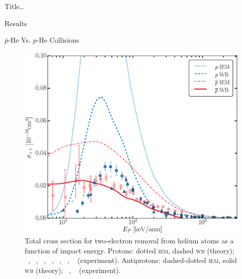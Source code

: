 \documentclass[letterpaper, 10 pt]{report}
\begin{document}
\begin{chapter}{ Title\dots \label{chap:p-he2p-he}}
\begin{section}{Results \label{sec:phe2p-res}}
\begin{subsection}{ \texorpdfstring{$\bar{p}$}{pbar}-He Vs. \texorpdfstring{$p$}{p}-He Collisions
                         \label{sec:pbarhe-res}}
\begin{figure}[ht]
\begin{minipage}{.49\linewidth}
               \centering
               \includegraphics[width = \linewidth]{./images/pbarhe/pbarhe-++.eps}
               \caption[Total cross section for two-electron removal from helium atoms as a function of
                        impact energy]
                       {Total cross section for two-electron removal from helium atoms as a function
                        of impact energy. Protons: dotted \textsc{iem}, dashed \textsc{wb} (theory);
                        {\color{blue}{$\blacktriangle$}}~\cite{DTR84}, {\color{blue}{$+$}}~\cite{Sol62},
                        {\color{blue}{$\bullet$}}~\cite{SG89},
                        {\color{blue}{$\blacklozenge$}}~\cite{SG85},
                       {\color{blue}{$\blacktriangleright$}}~\cite{PM70},
                       {\color{blue}{$\blacktriangledown$}}~\cite{Wex64},
                       {\color{blue}{$\blacksquare$}}~\cite{KAH84} (experiment).
                       Antiprotons: dashed-dotted \textsc{iem}, solid \textsc{wb} (theory);
                       {\color{red}{$\circ$}}~\cite{HKM94}, {\color{red}{$\triangleleft$}}~\cite{KKT09}
                       (experiment). \label{fig:he++}}
            \end{minipage}
         \end{figure}


\end{subsection}
\end{section}
\end{chapter}
\end{document}
